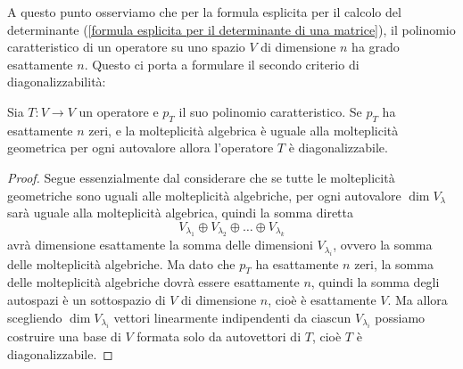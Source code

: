 \documentclass[11pt]{scrartcl}
\begin{document}
   	 A questo punto osserviamo che per la formula esplicita per il calcolo del determinante (\ref{formula esplicita per il determinante di una matrice}), il polinomio caratteristico di un operatore su uno spazio $V$ di dimensione $n$ ha grado esattamente $n$. Questo ci porta a formulare il secondo criterio di diagonalizzabilità:
   	 \begin{corollary}
   	 	Sia $T:V\to V$ un operatore e $p_T$ il suo polinomio caratteristico. Se $p_T$ ha esattamente $n$ zeri, e la molteplicità algebrica è uguale alla molteplicità geometrica per ogni autovalore allora l'operatore $T$ è diagonalizzabile.
   	 \end{corollary}
   	 \begin{proof}
   	 	Segue essenzialmente dal considerare che se tutte le molteplicità geometriche sono uguali alle molteplicità algebriche, per ogni autovalore $\dim V_\lambda$ sarà uguale alla molteplicità algebrica, quindi la somma diretta 
   	 	$$V_{\lambda_1} \oplus V_{\lambda_2}\oplus \dots \oplus V_{\lambda_k}$$
   	 	avrà dimensione esattamente la somma delle dimensioni $V_{\lambda_i}$, ovvero la somma delle molteplicità algebriche. Ma dato che $p_T$ ha esattamente $n$ zeri, la somma delle molteplicità algebriche dovrà essere esattamente $n$, quindi la somma degli autospazi è un sottospazio di $V$ di dimensione $n$, cioè è esattamente $V$. Ma allora scegliendo $\dim V_{\lambda_i}$ vettori linearmente indipendenti da ciascun $V_{\lambda_i}$ possiamo costruire una base di $V$ formata solo da autovettori di $T$, cioè $T$ è diagonalizzabile.
   	 \end{proof}
\end{document}
